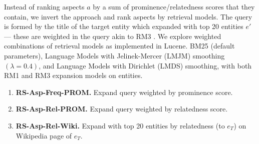 Instead of ranking aspects $a$ by a sum of prominence/relatedness scores that they contain, we invert the approach and rank aspects by retrieval models. The query is formed by the title of the target entity which expanded with top 20 entities $e'$ --- these are weighted in the query akin to RM3 \cite{lavrenko2001relevance}. We explore weighted combinations of retrieval models as implemented in Lucene. BM25 (default parameters), Language Models with Jelinek-Mercer (LMJM) smoothing $(\lambda = 0.4)$, and Language Models with Dirichlet (LMDS) smoothing, with both RM1 and RM3 expansion models on entities.


    
\begin{enumerate}        
    \item \textbf{RS-Asp-Freq-PROM.} Expand query weighted by prominence score.
    \item \textbf{RS-Asp-Rel-PROM.} Expand query weighted by relatedness score.
    \item \textbf{RS-Asp-Rel-Wiki.} Expand with top 20 entities by relatedness (to $e_T$) on Wikipedia page of $e_T$.
\end{enumerate}




 


